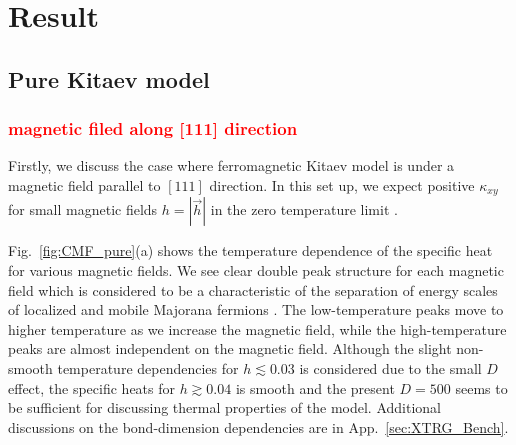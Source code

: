 \documentclass[reprint,amsmath,amssymb,aps,prx]{revtex4-2}
\newcommand{\red}[1]{\textcolor{red}{#1}}
\begin{document}
\section{Result}
  \subsection{Pure Kitaev model}
   \subsubsection{\red{magnetic filed along [111] direction}}
Firstly, we discuss the case where ferromagnetic Kitaev model is under a magnetic field parallel to $[111]$ direction. In this set up, we expect positive $\kappa_{xy}$ for small magnetic fields $h = |\vec{h}|$ in the zero temperature limit \cite{Kitaev2006}. 

Fig.~\ref{fig:CMF_pure}(a) shows the temperature dependence of the specific heat for various magnetic fields. We see clear double peak structure for each magnetic field which is considered to be a characteristic of the separation of energy scales of localized and mobile Majorana fermions \cite{NasuUM2014,NasuUM2015}. The low-temperature peaks move to higher temperature as we increase the magnetic field, while the high-temperature peaks are almost independent on the magnetic field. Although the slight non-smooth temperature dependencies for $h \lesssim 0.03$ is considered due to the small $D$ effect, the specific heats for $h \gtrsim 0.04$ is smooth and the present $D=500$ seems to be sufficient for discussing thermal properties of the model. Additional discussions on the bond-dimension dependencies are in App.~\ref{sec:XTRG_Bench}.
\end{document}
